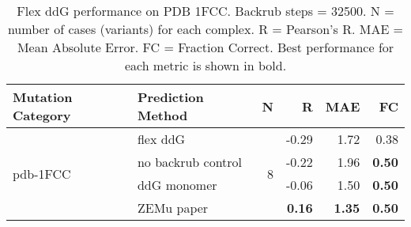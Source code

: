 \begin{table}
  \begin{tabular}{llrrrr}
\toprule
Mutation Category &   Prediction Method &  N &     R &  MAE &   FC \\
\midrule
 \multirow{ 4}{*}{pdb-1FCC} & flex ddG & \multirow{ 4}{*}{8} & -0.29 & 1.72 & 0.38  \\
 & no backrub control & & -0.22 & 1.96 & \textbf{0.50}  \\
 & ddG monomer & & -0.06 & 1.50 & \textbf{0.50}  \\
 & ZEMu paper & & \textbf{0.16} & \textbf{1.35} & \textbf{0.50}  \\
\bottomrule
\end{tabular}
  \caption[Flex ddG performance on PDB 1FCC]{
    Flex ddG performance on PDB 1FCC. Backrub steps = 32500. N = number of cases (variants) for each complex. R = Pearson's R. MAE = Mean Absolute Error. FC = Fraction Correct. Best performance for each metric is shown in bold.
  } \label{tab:table-pdb-1FCC}
\end{table}
